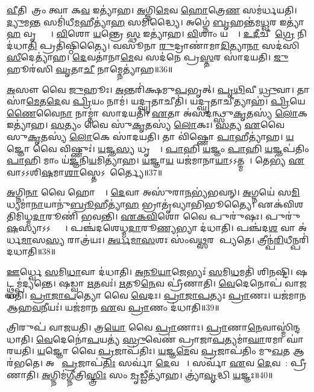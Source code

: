 \ul{𑌵𑍀}𑌤𑌿𑌹𑍋᳚𑌤𑍍𑌰𑌂 𑌤𑍍𑌵𑌾 𑌕\ul{𑌵} 𑌇𑌤𑍍𑌯𑌾॑𑌹।
\ul{𑌅}𑌗𑍍𑌨𑌿\ul{𑌮𑍇}𑌵 \ul{𑌹𑍋}𑌤𑍍𑌰𑍇\ul{𑌣} 𑌸𑌮॑𑌰𑍍𑌧𑌯𑌤𑌿।
\ul{𑌦𑍍𑌯𑍁}𑌮\ul{𑌨𑍍𑌤}\ul{} 𑌸𑌮𑌿॑𑌧𑍀\ul{𑌮}𑌹𑍀𑌤𑍍𑌯𑌾॑\ul{𑌹} 𑌸𑌮𑌿॑𑌦𑍍𑌧𑍍𑌯𑍈।
𑌅𑌗𑍍𑌨𑍇॑ \ul{𑌬𑍃}𑌹𑌨𑍍𑌤॑𑌮\ul{𑌧𑍍𑌵}𑌰 𑌇𑌤𑍍𑌯𑌾॑\ul{𑌹} 𑌵𑍃𑌦𑍍𑌧𑍍𑌯𑍈᳚।
\ul{𑌵𑌿}𑌶𑍋 \ul{𑌯}𑌨𑍍𑌤𑍍𑌰𑍇 \ul{𑌸𑍍𑌥} 𑌇𑌤𑍍𑌯𑌾॑𑌹।
\ul{𑌵𑌿}𑌶𑌾𑌂 𑌯𑌤𑍍𑌯𑍈᳚।
\ul{𑌉}\ul{𑌦𑍀}𑌚𑍀𑌨𑌾᳚\ul{𑌗𑍍𑌰𑍇} 𑌨𑌿 𑌦॑𑌧𑌾\ul{𑌤𑌿} 𑌪𑍍𑌰𑌤𑌿॑\-𑌷𑍍𑌠𑌿𑌤𑍍𑌯𑍈।
𑌵𑌸𑍂॑𑌨𑌾 \ul{𑌰𑍁}𑌦𑍍𑌰𑌾𑌣𑌾॑𑌮𑌾\ul{𑌦𑌿}𑌤𑍍𑌯𑌾\ul{𑌨𑌾}\ul{} 𑌸𑌦॑𑌸𑌿 \ul{𑌸𑍀}𑌦𑍇𑌤𑍍𑌯𑌾॑𑌹।
\ul{𑌦𑍇}𑌵𑌤𑌾॑𑌨𑌾\ul{𑌮𑍇}𑌵 𑌸𑌦॑𑌨𑍇 𑌪𑍍𑌰\ul{𑌸𑍍𑌤}𑌰 𑌸𑌾॑𑌦𑌯𑌤𑌿।
\ul{𑌜𑍁}𑌹𑍂𑌰॑𑌸𑌿 \ul{𑌘𑍃}𑌤𑌾\ul{𑌚𑍀} 𑌨𑌾𑌮𑍍𑌨𑍇𑌤𑍍𑌯𑌾॑𑌹॥36॥

\ul{𑌅}𑌸𑍗 𑌵𑍈 \ul{𑌜𑍁}𑌹𑍂𑌃।
\ul{𑌅}𑌨𑍍𑌤𑌰𑌿॑𑌕𑍍𑌷𑌮𑍁\ul{𑌪}𑌭𑍃𑌤𑍍।
\ul{𑌪𑍃}\ul{𑌥𑌿}𑌵𑍀 \ul{𑌧𑍍𑌰𑍁}𑌵𑌾।
𑌤𑌾𑌸𑌾॑\ul{𑌮𑍇}𑌤\ul{𑌦𑍇}𑌵 \ul{𑌪𑍍𑌰𑌿}𑌯𑌂 𑌨𑌾𑌮॑।
𑌯𑌦𑍍\mbox{}\ul{𑌘𑍃}𑌤𑌾𑌚𑍀𑌤𑌿॑।
𑌯𑌦𑍍\mbox{}\ul{𑌘𑍃}𑌤𑌾𑌚𑍀𑌤𑍍𑌯𑌾𑌹॑।
\ul{𑌪𑍍𑌰𑌿}𑌯𑍇\ul{𑌣𑍈}𑌵𑍈\ul{𑌨𑌾} 𑌨𑌾𑌮𑍍𑌨𑌾॑ 𑌸𑌾𑌦𑌯𑌤𑌿।
\ul{𑌏}𑌤𑌾 𑌅॑𑌸𑌦𑌨𑍍𑌥𑍍𑌸𑍁\ul{𑌕𑍃}𑌤𑌸𑍍𑌯॑ \ul{𑌲𑍋}𑌕 𑌇𑌤𑍍𑌯𑌾॑𑌹।
\ul{𑌸}𑌤𑍍𑌯𑌂 𑌵𑍈 𑌸𑍁॑\ul{𑌕𑍃}𑌤𑌸𑍍𑌯॑ \ul{𑌲𑍋}𑌕𑌃।
\ul{𑌸}𑌤𑍍𑌯 \ul{𑌏}𑌵𑍈𑌨𑌾𑌃᳚ 𑌸𑍁\ul{𑌕𑍃}𑌤𑌸𑍍𑌯॑ \ul{𑌲𑍋}𑌕𑍇 𑌸𑌾॑𑌦𑌯𑌤𑌿।
𑌤𑌾 𑌵𑌿॑𑌷𑍍𑌣𑍋 \ul{𑌪𑌾}𑌹𑍀𑌤𑍍𑌯𑌾॑𑌹।
\ul{𑌯}𑌜𑍍𑌞𑍋 𑌵𑍈 𑌵𑌿𑌷𑍍𑌣𑍁𑌃॑।
\ul{𑌯}𑌜𑍍𑌞\ul{𑌸𑍍𑌯} 𑌧𑍃𑌤𑍍𑌯𑍈᳚।
\ul{𑌪𑌾}𑌹𑌿 \ul{𑌯}𑌜𑍍𑌞𑌂 \ul{𑌪𑌾}𑌹𑌿 \ul{𑌯}𑌜𑍍𑌞𑌪॑𑌤𑌿𑌂 \ul{𑌪𑌾}𑌹𑌿 𑌮𑌾𑌂 𑌯॑\ul{𑌜𑍍𑌞}𑌨𑌿\ul{𑌯}𑌮𑌿𑌤𑍍𑌯𑌾॑𑌹।
\ul{𑌯}𑌜𑍍𑌞𑌾\ul{𑌯} 𑌯𑌜॑𑌮𑌾𑌨𑌾\ul{𑌯𑌾}𑌽𑌽𑌤𑍍𑌮𑌨𑍇᳚।
𑌤𑍇𑌭𑍍𑌯॑ \ul{𑌏}𑌵𑌾𑌽𑌽𑌶𑌿\ul{𑌷}𑌮𑌾\ul{𑌶𑌾}𑌸𑍍𑌤𑍇\-𑌽𑌨𑌾᳚𑌰𑍍𑌤𑍍𑌯𑍈॥37॥\anuvakamend[𑌸𑍍𑌥𑍇𑌤𑍍𑌯𑌾॑𑌹 𑌪𑍃\ul{𑌥𑌿}𑌵𑍀 𑌵𑍇\ul{𑌦𑌿}𑌰𑍍𑌯𑌨𑍍𑌤𑌿॑ \ul{𑌕𑍍𑌰𑌿}𑌯\ul{𑌤𑍇} 𑌵𑍀𑌣𑍁॑\ul{𑌰𑍍𑌵𑍀}𑌰𑍍𑌯॑𑌸𑌮𑍍𑌮𑌿𑌤𑌂 𑌕𑌰𑍋𑌤𑍍𑌯𑌾𑌹 𑌪𑌾\ul{𑌤𑌿} 𑌨𑌾𑌮𑍍𑌨𑍇𑌤𑍍𑌯𑌾॑𑌹 \ul{𑌲𑍋}𑌕𑍇 𑌸𑌾॑𑌦𑌯\ul{𑌤𑌿} 𑌷𑌟𑍍 𑌚॑]

\ul{𑌅}𑌗𑍍𑌨𑌿\ul{𑌨𑌾} 𑌵𑍈 𑌹𑍋𑌤𑍍𑌰𑌾᳚।
\ul{𑌦𑍇}𑌵𑌾 𑌅𑌸𑍁॑𑌰𑌾\ul{𑌨}𑌭𑍍𑌯॑𑌭𑌵𑌨𑍍।
\ul{𑌅}𑌗𑍍𑌨𑌯𑍇॑ 𑌸\ul{𑌮𑌿}𑌧𑍍𑌯𑌮𑌾॑\ul{𑌨𑌾}𑌯𑌾𑌨𑍁॑\ul{𑌬𑍍𑌰𑍂}𑌹𑍀𑌤𑍍𑌯𑌾॑\ul{𑌹} 𑌭𑍍𑌰𑌾𑌤𑍃॑𑌵𑍍𑌯𑌾𑌭𑌿𑌭𑍂𑌤𑍍𑌯𑍈।
𑌏𑌕॑𑌵𑌿𑌶𑌤𑌿\-𑌮𑌿𑌧𑍍𑌮\ul{𑌦𑌾}𑌰𑍂𑌣𑌿॑ 𑌭𑌵𑌨𑍍𑌤𑌿।
\ul{𑌏}\ul{𑌕}\ul{𑌵𑌿}\ul{}𑌶𑍋 𑌵𑍈 𑌪𑍁𑌰𑍁॑𑌷𑌃।
𑌪𑍁𑌰𑍁॑\ul{𑌷}𑌸𑍍𑌯𑌾𑌽𑌽𑌪𑍍𑌤𑍍𑌯𑍈᳚।
𑌪𑌞𑍍𑌚॑𑌦𑌶𑍇𑌧𑍍𑌮\-\ul{𑌦𑌾}𑌰𑍂\ul{𑌣𑍍𑌯}𑌭𑍍𑌯𑌾 𑌦॑𑌧𑌾𑌤𑌿।
𑌪𑌞𑍍𑌚॑𑌦\ul{𑌶} 𑌵𑌾 𑌅॑𑌰𑍍𑌧\ul{𑌮𑌾}𑌸\ul{𑌸𑍍𑌯} 𑌰𑌾𑌤𑍍𑌰॑𑌯𑌃।
\ul{𑌅}\ul{𑌰𑍍𑌧}\ul{𑌮𑌾}\ul{𑌸}𑌶𑌃 𑌸𑌂॑𑌵\ul{𑌥𑍍𑌸}𑌰 𑌆᳚𑌪𑍍𑌯𑌤𑍇।
𑌤𑍍𑌰𑍀𑌨𑍍𑌪॑\ul{𑌰𑌿}𑌧𑍀𑌨𑍍𑌪𑌰𑌿॑ 𑌦𑌧𑌾𑌤𑌿॥38॥

\ul{𑌊}𑌰𑍍𑌧𑍍𑌵𑍇 \ul{𑌸}𑌮𑌿\ul{𑌧𑌾}𑌵𑌾 𑌦॑𑌧𑌾𑌤𑌿।
\ul{𑌅}\ul{𑌨𑍂}\ul{𑌯𑌾}𑌜𑍇𑌭𑍍𑌯𑌃॑ \ul{𑌸}𑌮𑌿\ul{𑌧}𑌮𑌤𑌿॑ 𑌶𑌿𑌨𑌷𑍍𑌟𑌿।
𑌷𑌟𑍍𑌥𑍍𑌸𑌮𑍍𑌪॑𑌦𑍍𑌯𑌨𑍍𑌤𑍇।
𑌷𑌡𑍍𑌵𑌾 \ul{𑌋}𑌤𑌵𑌃॑।
\ul{𑌋}𑌤𑍂\ul{𑌨𑍇}𑌵 𑌪𑍍𑌰𑍀॑𑌣𑌾𑌤𑌿।
\ul{𑌵𑍇}𑌦𑍇𑌨𑍋𑌪॑ 𑌵𑌾𑌜𑌯𑌤𑌿।
\ul{𑌪𑍍𑌰𑌾}\ul{𑌜𑌾}\ul{𑌪}𑌤𑍍𑌯𑍋 𑌵𑍈 \ul{𑌵𑍇}𑌦𑌃।
\ul{𑌪𑍍𑌰𑌾}\ul{𑌜𑌾}\ul{𑌪}𑌤𑍍𑌯𑌃 \ul{𑌪𑍍𑌰𑌾}𑌣𑌃।
𑌯𑌜॑𑌮𑌾𑌨 𑌆𑌹\ul{𑌵}𑌨𑍀𑌯𑌃॑।
𑌯𑌜॑𑌮𑌾𑌨 \ul{𑌏}𑌵 \ul{𑌪𑍍𑌰𑌾}𑌣𑌂 𑌦॑𑌧𑌾𑌤𑌿॥39॥

𑌤𑍍𑌰𑌿𑌰𑍁𑌪॑ 𑌵𑌾𑌜𑌯𑌤𑌿।
𑌤𑍍𑌰\ul{𑌯𑍋} 𑌵𑍈 \ul{𑌪𑍍𑌰𑌾}𑌣𑌾𑌃।
\ul{𑌪𑍍𑌰𑌾}𑌣𑌾\ul{𑌨𑍇}𑌵𑌾𑌸𑍍𑌮𑌿॑𑌨𑍍𑌦𑌧𑌾𑌤𑌿।
\ul{𑌵𑍇}𑌦𑍇𑌨𑍋॑\ul{𑌪}𑌯𑌤𑍍𑌯॑ \ul{𑌸𑍍𑌰𑍁}𑌵𑍇𑌣॑ 𑌪𑍍𑌰𑌾𑌜𑌾\ul{𑌪}𑌤𑍍𑌯𑌮𑌾॑\ul{𑌘𑌾}𑌰𑌮𑌾 𑌘𑌾॑𑌰𑌯𑌤𑌿।
\ul{𑌯}𑌜𑍍𑌞𑍋 𑌵𑍈 \ul{𑌪𑍍𑌰}𑌜𑌾𑌪॑𑌤𑌿𑌃।
\ul{𑌯}𑌜𑍍𑌞\ul{𑌮𑍇}𑌵 \ul{𑌪𑍍𑌰}𑌜𑌾𑌪॑𑌤𑌿𑌂 𑌮𑍁\ul{𑌖}𑌤 𑌆𑌰॑𑌭𑌤𑍇।
𑌅𑌥𑍋᳚ \ul{𑌪𑍍𑌰}𑌜𑌾𑌪॑\ul{𑌤𑌿𑌃} 𑌸𑌰𑍍𑌵𑌾॑ \ul{𑌦𑍇}𑌵𑌤𑌾𑌃᳚।
𑌸𑌰𑍍𑌵𑌾॑ \ul{𑌏}𑌵 \ul{𑌦𑍇}𑌵𑌤𑌾᳚: 𑌪𑍍𑌰𑍀𑌣𑌾𑌤𑌿।
\ul{𑌅}𑌗𑍍𑌨𑌿𑌮॑\ul{𑌗𑍍𑌨𑍀}𑌤𑍍𑌰𑌿\ul{𑌸𑍍𑌤𑍍𑌰𑌿𑌃} 𑌸𑌂 \ul{𑌮𑍃}𑌡𑍍𑌢𑍀𑌤𑍍𑌯𑌾॑𑌹।
𑌤𑍍𑌰𑍍𑌯𑌾॑\ul{𑌵𑍃}𑌦𑍍𑌧𑌿 \ul{𑌯}𑌜𑍍𑌞𑌃॥40॥

